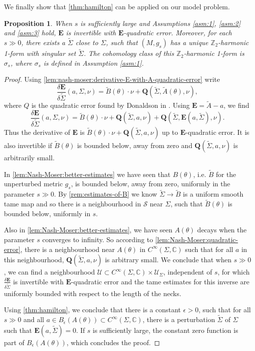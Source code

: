 \documentclass[preprint,12pt]{elsarticle}
\numberwithin{table}{section}
\newtheorem{proposition}[lemma]{Proposition}
\newcommand{\Z}{\mathbb{Z}}
\newcommand{\C}{\mathbb{C}}
\begin{document}
We finally show that \cref{thm:hamilton} can be applied on our model problem.
\begin{proposition}
	\label{prop:application-nash-moser-with-assumptions}
	When $s$ is sufficiently large and Assumptions \ref{asm:1}, \ref{asm:2} and \ref{asm:3} hold, $\mathbf{E}$ is invertible with $\mathbf{E}$-quadratic error. Moreover, for each $s \gg 0$, there exists a $\tilde \Sigma$ close to $\Sigma$, such that $(M,g_s)$ has a unique $\Z_2$-harmonic 1-form with singular set $\tilde \Sigma$. The cohomology class of this $\Z_2$-harmonic 1-form is $\sigma_s$, where $\sigma_s$ is defined in Assumption \ref{asm:1}.
\end{proposition}
\begin{proof}
	Using \cref{lem:nash-moser:derivative-E-with-A-quadratic-error} write
	$$
	\frac{\delta \mathbf{E}}{\delta \tilde \Sigma} (a, \Sigma, \nu) = \tilde B(\theta) \cdot \nu + \mathbf{Q}(\tilde \Sigma, \tilde A(\theta), \nu),
	$$
	where $Q$ is the quadratic error found by Donaldson in \cite{Donaldson2021}.
	Using $\mathbf{E} = \tilde A - a$, we find
	$$
	\frac{\delta \mathbf{E}}{\delta \tilde \Sigma} (a, \Sigma, \nu) = \tilde B(\theta) \cdot \nu + \mathbf{Q}(\tilde \Sigma, a, \nu)
	+ \mathbf{Q}(\tilde \Sigma, \mathbf{E}(a, \tilde \Sigma), \nu).
	$$
	Thus the derivative of $\mathbf{E}$ is $\tilde B(\theta) \cdot \nu + \mathbf{Q}(\tilde \Sigma, a, \nu)$ up to $\mathbf{E}$-quadratic error. It is also invertible if $\tilde B(\theta)$ is bounded below, away from zero and $\mathbf{Q}(\tilde \Sigma, a, \nu)$ is arbitrarily small.
	
	In \cref{lem:Nash-Moser:better-estimates} we have seen that $B(\theta)$, i.e. $\tilde B$ for the unperturbed metric $g_s$, is bounded below, away from zero, uniformly in the parameter $s \gg 0$. By \cref{rem:estimates-of-B} we know $\tilde \Sigma \to \tilde B$ is a uniform smooth tame map and so there is a neighbourhood in $\mathcal{S} $ near $\Sigma$, such that $\tilde B(\theta)$ is bounded below, uniformly in $s$. 
	
	Also in \cref{lem:Nash-Moser:better-estimates}, we have seen $A(\theta)$ decays when the parameter $s$ converges to infinity. So according to \cref{lem:Nash-Moser:quadratic-error}, there is a neighbourhood near $A(\theta)$ in $C^{\infty}(\Sigma, \C)$ such that for all $a$ in this neighbourhood, $\mathbf{Q}(\tilde \Sigma, a, \nu)$ is arbitrary small. We conclude that when $s \gg 0$, we can find a neighbourhood $\mathcal{U} \subset C^\infty(\Sigma, \C) \times \mathcal{U}_{\Sigma}$, independent of $s$, for which $\frac{\delta \mathbf{E}}{\delta \tilde \Sigma}$ is invertible with $\mathbf{E}$-quadratic error and the tame estimates for this inverse are uniformly bounded with respect to the length of the necks.
	
	Using \cref{thm:hamilton}, we conclude that there is a constant $\epsilon > 0$, such that for all $s \gg 0$ and all $a \in B_{\epsilon}(A(\theta)) \subset C^\infty(\Sigma, \C)$, there is a perturbation $\tilde \Sigma$ of $\Sigma$ such that $\mathbf{E}(a, \tilde \Sigma) = 0$. If $s$ is sufficiently large, the constant zero function is part of $B_\epsilon(A(\theta))$, which concludes the proof.
\end{proof}
\end{document}
